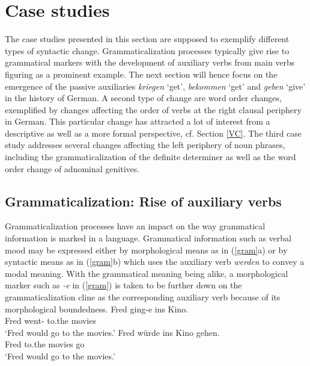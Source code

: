 \documentclass[output=paper
	        ,collection
	        ,collectionchapter
 	        ,biblatex
                ,babelshorthands
                ,newtxmath
                ,draftmode
                ,colorlinks, citecolor=brown
]{./langsci/langscibook}
\begin{document}
\section{Case studies}

The case studies presented in this section are supposed to exemplify different types of syntactic change. Grammaticalization processes typically give rise to grammatical markers with the development of auxiliary verbs from main verbs figuring as a prominent example. The next section will hence focus on the emergence of the passive auxiliaries \textit{kriegen} `get', \textit{bekommen} `get' and \textit{geben} `give' in the history of German. A second type of change are word order changes, exemplified by changes affecting the order of verbs at the right clausal periphery in German. This particular change has attracted a lot of interest from a descriptive as well as a more formal perspective, cf. Section \ref{VC}. The third case study addresses several changes affecting the left periphery of noun phrases, including the grammaticalization of the definite determiner as well as the word order change of adnominal genitives. 

\subsection{Grammaticalization: Rise of auxiliary verbs \label{GR}} 

Grammaticalization processes have an impact on the way grammatical information is marked in a language. Grammatical information such as verbal mood may be expressed either by morphological means as in (\ref{gram}a) or by syntactic means as in (\ref{gram}b) which uses the auxiliary verb \textit{werden} to convey a modal meaning. With the grammatical meaning being alike, a morphological marker such as \textit{-e} in (\ref{gram}) is taken to be further down on the grammaticalization cline as the corresponding auxiliary verb because of its morphological boundedness.  
\eal \label{gram}
\ex 
\gll Fred ging-e       ins Kino.\\  
     Fred went-\SBJV{} to.the movies\\  
\glt `Fred would go to the movies.'
\ex
\gll  Fred würde ins Kino gehen.\\ 
      Fred \SBJV{} to.the movies go\\  
\glt `Fred would go to the movies.'
\zl
\end{document}
